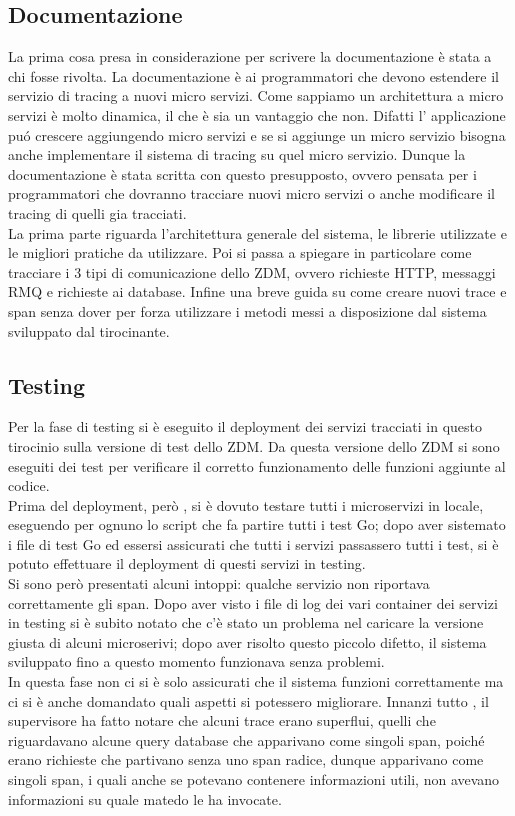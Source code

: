 \documentclass[a4paper,12pt,titlepage,italian,openany]{report}
\begin{document}
 \subsection{Documentazione}
 La prima cosa presa in considerazione per scrivere la documentazione è stata  a chi fosse rivolta. La documentazione è ai programmatori che devono estendere il servizio di tracing a nuovi micro servizi. Come sappiamo un architettura a micro servizi è molto dinamica, il che è sia un vantaggio che non. Difatti l' applicazione puó crescere aggiungendo micro servizi e se si aggiunge un micro servizio bisogna anche implementare il sistema di tracing su quel micro servizio.
 Dunque la documentazione è stata scritta con questo presupposto, ovvero pensata per i programmatori che dovranno tracciare nuovi micro servizi o anche modificare il tracing di quelli gia tracciati.\\
 La prima parte riguarda l'architettura generale del sistema, le librerie utilizzate e le migliori pratiche da utilizzare. Poi si passa a spiegare in particolare come tracciare i 3 tipi di comunicazione dello ZDM\cite{zdm:1}, ovvero richieste HTTP, messaggi RMQ e richieste ai database. 
 Infine una breve guida su come creare nuovi trace e span senza dover per forza utilizzare i metodi messi a disposizione dal sistema sviluppato dal tirocinante. 


\subsection{Testing}
Per la fase di testing si è eseguito il deployment dei servizi tracciati in questo tirocinio sulla versione di test dello ZDM\cite{zdm:1}.
 Da questa versione dello ZDM\cite{zdm:1} si sono eseguiti dei test per verificare il corretto funzionamento delle funzioni aggiunte al codice.\\
Prima del deployment, però , si è dovuto testare tutti i microservizi in locale, eseguendo per ognuno lo script che fa partire tutti i test Go;
 dopo aver sistemato i file di test Go ed essersi assicurati che tutti i servizi passassero tutti i test, si è potuto effettuare il deployment di questi servizi in testing.\\ 
Si sono però presentati alcuni intoppi: qualche servizio non riportava correttamente gli span. 
Dopo aver visto i file di log dei vari container dei servizi in testing si è subito notato che c'è stato un problema nel caricare la versione giusta di alcuni microserivi; dopo aver risolto questo piccolo difetto, il sistema sviluppato fino a questo momento funzionava senza problemi.
\\In questa fase non ci si è solo assicurati che il sistema funzioni correttamente ma ci si è anche domandato quali aspetti si potessero migliorare. Innanzi tutto , il supervisore ha fatto notare che alcuni trace erano superflui, quelli che riguardavano alcune query database che apparivano come singoli span, poiché erano richieste che partivano senza uno span radice, dunque apparivano come singoli span, i quali anche 
se potevano contenere informazioni utili, non avevano informazioni su quale matedo le ha invocate.
\cite{opentracing:1}
\end{document}
